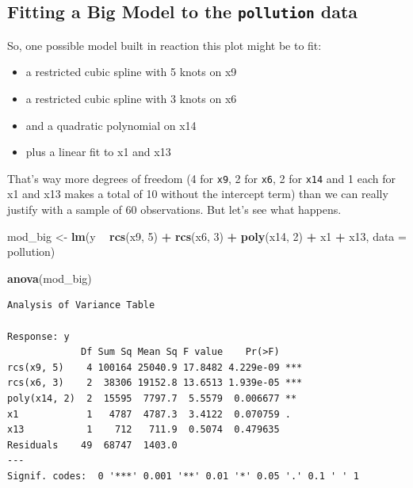 \documentclass[]{book}
\newenvironment{Shaded}{\begin{snugshade}}{\end{snugshade}}
\newcommand{\KeywordTok}[1]{\textcolor[rgb]{0.13,0.29,0.53}{\textbf{#1}}}
\newcommand{\DataTypeTok}[1]{\textcolor[rgb]{0.13,0.29,0.53}{#1}}
\newcommand{\DecValTok}[1]{\textcolor[rgb]{0.00,0.00,0.81}{#1}}
\newcommand{\StringTok}[1]{\textcolor[rgb]{0.31,0.60,0.02}{#1}}
\newcommand{\OperatorTok}[1]{\textcolor[rgb]{0.81,0.36,0.00}{\textbf{#1}}}
\newcommand{\NormalTok}[1]{#1}
\providecommand{\tightlist}{%
  \setlength{\itemsep}{0pt}\setlength{\parskip}{0pt}}
\theoremstyle{definition}
\theoremstyle{definition}
\theoremstyle{definition}
\theoremstyle{remark}
\begin{document}
\subsection{\texorpdfstring{Fitting a Big Model to the
\texttt{pollution}
data}{Fitting a Big Model to the pollution data}}\label{fitting-a-big-model-to-the-pollution-data}

So, one possible model built in reaction this plot might be to fit:

\begin{itemize}
\tightlist
\item
  a restricted cubic spline with 5 knots on x9
\item
  a restricted cubic spline with 3 knots on x6
\item
  and a quadratic polynomial on x14
\item
  plus a linear fit to x1 and x13
\end{itemize}

That's way more degrees of freedom (4 for \texttt{x9}, 2 for
\texttt{x6}, 2 for \texttt{x14} and 1 each for x1 and x13 makes a total
of 10 without the intercept term) than we can really justify with a
sample of 60 observations. But let's see what happens.

\begin{Shaded}
\begin{Highlighting}[]
\NormalTok{mod_big <-}\StringTok{ }\KeywordTok{lm}\NormalTok{(y }\OperatorTok{~}\StringTok{ }\KeywordTok{rcs}\NormalTok{(x9, }\DecValTok{5}\NormalTok{) }\OperatorTok{+}\StringTok{ }\KeywordTok{rcs}\NormalTok{(x6, }\DecValTok{3}\NormalTok{) }\OperatorTok{+}\StringTok{ }\KeywordTok{poly}\NormalTok{(x14, }\DecValTok{2}\NormalTok{) }\OperatorTok{+}\StringTok{ }\NormalTok{x1 }\OperatorTok{+}\StringTok{ }\NormalTok{x13, }\DataTypeTok{data =}\NormalTok{ pollution)}

\KeywordTok{anova}\NormalTok{(mod_big)}
\end{Highlighting}
\end{Shaded}

\begin{verbatim}
Analysis of Variance Table

Response: y
             Df Sum Sq Mean Sq F value    Pr(>F)    
rcs(x9, 5)    4 100164 25040.9 17.8482 4.229e-09 ***
rcs(x6, 3)    2  38306 19152.8 13.6513 1.939e-05 ***
poly(x14, 2)  2  15595  7797.7  5.5579  0.006677 ** 
x1            1   4787  4787.3  3.4122  0.070759 .  
x13           1    712   711.9  0.5074  0.479635    
Residuals    49  68747  1403.0                      
---
Signif. codes:  0 '***' 0.001 '**' 0.01 '*' 0.05 '.' 0.1 ' ' 1
\end{verbatim}
\end{document}
